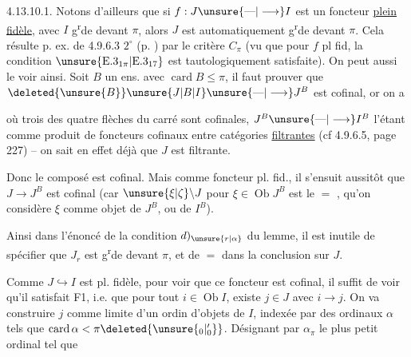 4.13.10.1. Notons d'ailleurs que si
$f:J\unsure{\text{---}|\longrightarrow}I$ est un foncteur  \uline{plein} \uline{fidèle},
avec $I$ g\textsuperscript{r}de devant $\pi$, alors $J$ est
automatiquement g\textsuperscript{r}de devant $\pi$. Cela
résulte p. ex. de 4.9.6.3 $2^\circ$ (p. )
par le critère $C_\pi$ (vu que pour $f$ pl fid,
la condition $\unsure{\mathrm E.3_{1\pi}|\mathrm E.3_{17}}$ est tautologiquement
satisfaite). On peut aussi le voir ainsi.
Soit $B$ un ens. avec $\operatorname{card}B\leq\pi$,
il faut prouver que $\deleted{\unsure{B}}\unsure{J|B|I}\unsure{\text{---}|\longrightarrow}J^B$ est cofinal,
or on a


où trois des quatre flèches du carré
sont cofinales, $J^B\unsure{\text{---}|\longrightarrow}I^B$ l'étant comme
produit de foncteurs cofinaux entre
catégories \uline{filtrantes} (cf 4.9.6.5, page 227)
-- on sait en effet déjà que $J$ est filtrante.

Donc le composé
est cofinal. Mais comme 
 foncteur  pl. fid., 
il s'ensuit aussitôt que $J\longrightarrow J^B$
est cofinal (car $\unsure{\xi|\zeta}\backslash J$ pour $\xi\in\operatorname{Ob}J^B$
est le $=$ , qu'on considère $\xi$ comme
objet de $J^B$, ou de $I^B$).

Ainsi dans l'énoncé de la condition
$d)_{\unsure{r|\alpha}}$ du lemme, il est inutile de
spécifier que $J_r$ est g\textsuperscript{r}de devant $\pi$,
et de $=$ dans la conclusion sur $J$.

Comme $J\hookrightarrow I$ est pl. fidèle,
pour voir que ce foncteur est cofinal,
il suffit de voir qu'il satisfait F1,
i.e. que pour tout $i\in\operatorname{Ob} I$,
existe $j\in J$ avec $i\longrightarrow j$. On
va construire $j$ comme limite d'un
 ordin d'objets  de $I$,
indexée par des ordinaux $\alpha$ tels que
$\operatorname{card}\alpha<\pi\deleted{\unsure{{}_0|{}'_0}}$.
 Désignant
par $\alpha_\pi$ le plus petit ordinal tel que

